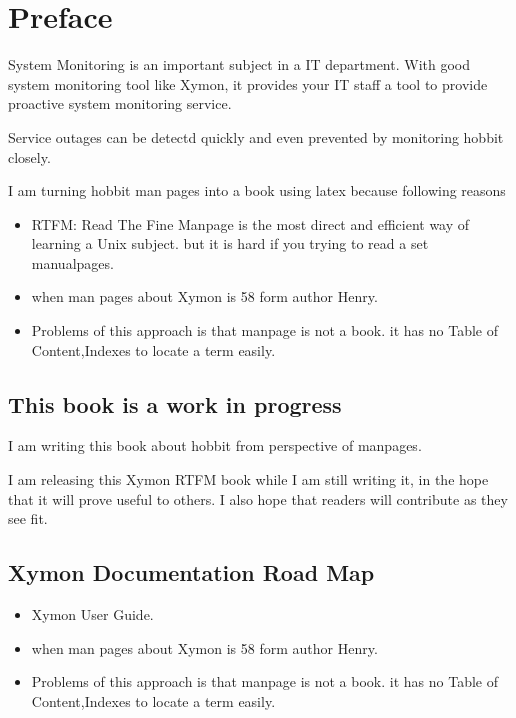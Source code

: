 \chapter{Preface}
\label{chap:preface}

System Monitoring is an important subject in a IT department.
With good system monitoring tool like Xymon, it provides your IT
staff a tool to provide proactive system monitoring service.

Service outages can be detectd quickly and even prevented by monitoring
hobbit closely.

I am turning hobbit man pages into a book using latex because following reasons

\begin{itemize}
\item RTFM: Read The Fine Manpage is the most direct and efficient way of
learning a Unix subject. but it is hard if you trying to read a set manualpages.
\item  when man pages about Xymon is 58 form author Henry.
\item Problems of this approach is that manpage is not a book. it has no
Table of Content,Indexes to locate a term easily.

\end{itemize}

\section{This book is a work in progress}

I am writing this  book about hobbit from perspective of manpages.  

I am releasing this Xymon RTFM book while I am still writing it, in the hope that
it will prove useful to others.  I also hope that readers will
contribute as they see fit.

\section{Xymon Documentation Road Map}

\begin{itemize}
\item Xymon User Guide.
\item when man pages about Xymon is 58 form author Henry.
\item Problems of this approach is that manpage is not a book. it has no
Table of Content,Indexes to locate a term easily.

\end{itemize}

